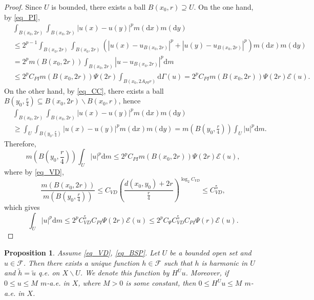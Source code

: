 \documentclass[11pt,a4paper]{article}
\numberwithin{equation}{section}
\theoremstyle{plain}
\newtheorem{proposition}[theorem]{Proposition}
\theoremstyle{definition}
\begin{document}
\begin{proof}
Since $U$ is bounded, there exists a ball $B(x_0,r)\supseteq U$. On the one hand, by \ref{eq_PI},
\begin{align*}
&\int_{B(x_0,2r)}\int_{B(x_0,2r)}|u(x)-u(y)|^pm(\mathrm{d} x)m(\mathrm{d} y)\\
&\le2^{p-1}\int_{B(x_0,2r)}\int_{B(x_0,2r)}\left(|u(x)-u_{B(x_0,2r)}|^p+|u(y)-u_{B(x_0,2r)}|^p\right)m(\mathrm{d} x)m(\mathrm{d} y)\\
&=2^pm(B(x_0,2r))\int_{B(x_0,2r)}|u-u_{B(x_0,2r)}|^p\mathrm{d} m\\
&\le{2^pC_{PI}m(B(x_0,2r))}{\Psi(2r)}\int_{B(x_0,2A_{PI}r)}\mathrm{d}\Gamma(u)={2^pC_{PI}m(B(x_0,2r))}{\Psi(2r)}\mathcal{E}(u).
\end{align*}
On the other hand, by \ref{eq_CC}, there exists a ball $B(y_0,\frac{r}{4})\subseteq B(x_0,2r)\backslash B(x_0,r)$, hence
\begin{align*}
&\int_{B(x_0,2r)}\int_{B(x_0,2r)}|u(x)-u(y)|^pm(\mathrm{d} x)m(\mathrm{d} y)\\
&\ge\int_{U}\int_{B(y_0,\frac{r}{4})}|u(x)-u(y)|^pm(\mathrm{d} x)m(\mathrm{d} y)=m(B(y_0,\frac{r}{4}))\int_U|u|^p\mathrm{d} m.
\end{align*}
Therefore,
$$m(B(y_0,\frac{r}{4}))\int_U|u|^p\mathrm{d} m\le {2^pC_{PI}m(B(x_0,2r))}{\Psi(2r)}\mathcal{E}(u),$$
where by \ref{eq_VD},
$$\frac{m(B(x_0,2r))}{m(B(y_0,\frac{r}{4}))}\le C_{VD}\left(\frac{d(x_0,y_0)+2r}{\frac{r}{4}}\right)^{\log_2C_{VD}}\le C_{VD}^5,$$
which gives
$$\int_{U}|u|^p\mathrm{d} m\le {2^pC_{VD}^5C_{PI}}{\Psi(2r)} \mathcal{E}(u)\le {2^pC_{\Psi}C_{VD}^5C_{PI}}{\Psi(r)} \mathcal{E}(u).$$
\end{proof}

\begin{proposition}\label{prop_harm_exist}
Assume \ref{eq_VD}, \ref{eq_BSP}. Let $U$ be a bounded open set and $u\in\mathcal{F}$. Then there exists a unique function $h\in\mathcal{F}$ such that $h$ is harmonic in $U$ and $\widetilde{h}=\widetilde{u}$ q.e. on $X\backslash U$. We denote this function by $H^Uu$. Moreover, if $0\le u\le M$ $m$-a.e. in $X$, where $M>0$ is some constant, then $0\le H^Uu\le M$ $m$-a.e. in $X$.
\end{proposition}
\end{document}
